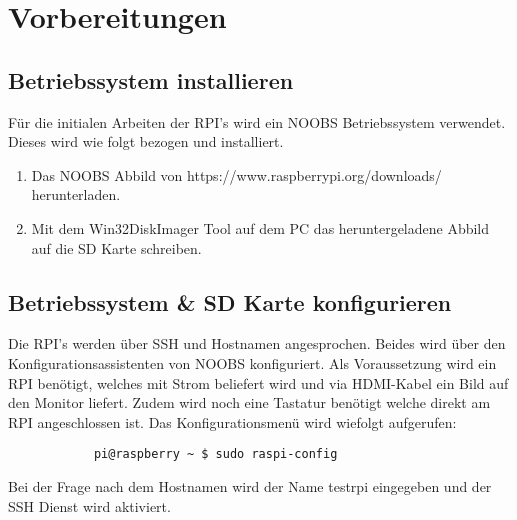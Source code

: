 \section{Vorbereitungen}
\subsection{Betriebssystem installieren}
Für die initialen Arbeiten der RPI's wird ein NOOBS Betriebssystem verwendet. Dieses wird wie folgt bezogen und installiert.

	\begin{enumerate}
	\item Das NOOBS Abbild von https://www.raspberrypi.org/downloads/ herunterladen.
	\item Mit dem Win32DiskImager Tool auf dem PC das heruntergeladene Abbild auf die SD Karte schreiben.
	\end{enumerate}


\subsection{Betriebssystem \& SD Karte konfigurieren}
Die RPI's werden über SSH und Hostnamen angesprochen. Beides wird über den Konfigurationsassistenten von NOOBS konfiguriert. Als Voraussetzung wird ein RPI benötigt, welches mit Strom beliefert wird und via HDMI-Kabel ein Bild auf den Monitor liefert. Zudem wird noch eine Tastatur benötigt welche direkt am RPI angeschlossen ist. Das Konfigurationsmenü wird wiefolgt aufgerufen:
         \begin{verbatim}
			pi@raspberry ~ $ sudo raspi-config
		 \end{verbatim} 
Bei der Frage nach dem Hostnamen wird der Name testrpi eingegeben und der SSH Dienst wird aktiviert.

